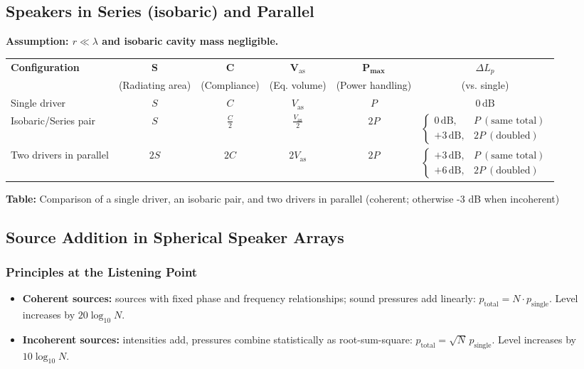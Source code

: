 \subsection{Speakers in Series (isobaric) and Parallel}
\textbf{Assumption: $r\ll\lambda$ and isobaric cavity mass negligible.}
\small
\begin{center}
\begin{tabular}{lccccc}
\toprule
\textbf{Configuration} & $\mathbf{S}$ & $\mathbf{C}$ & $\mathbf{V_{\mathrm{as}}}$ & $\mathbf{P_{\max}}$ & $\Delta L_p$ \\
 & (Radiating area) & (Compliance) & (Eq. volume) & (Power handling) & (vs. single) \\
\midrule
Single driver & 
$S$ & 
$C$ & 
$V_{\mathrm{as}}$ & 
$P$ & 
$0\,\mathrm{dB}$ \\

Isobaric/Series pair & 
$S$ & 
$\tfrac{C}{2}$ & 
$\tfrac{V_{\mathrm{as}}}{2}$ & 
$2P$ & 
$\begin{cases}
0\,\mathrm{dB}, & P\ (\text{same total})\\
+3\,\mathrm{dB}, & 2P\ (\text{doubled})
\end{cases}$ \\

Two drivers in parallel & 
$2S$ & 
$2C$ & 
$2V_{\mathrm{as}}$ & 
$2P$ & 
$\begin{cases}
+3\,\mathrm{dB}, & P\ (\text{same total})\\
+6\,\mathrm{dB}, & 2P\ (\text{doubled})
\end{cases}$\\
\bottomrule
\end{tabular}

\medskip
\textbf{Table:} Comparison of a single driver, an isobaric pair, and two drivers in parallel (coherent; otherwise -3 dB when incoherent)
\end{center}

\newpage
\subsection{Source Addition in Spherical Speaker Arrays}

\subsubsection{Principles at the Listening Point}
\begin{itemize}
  \item \textbf{Coherent sources:} sources with fixed phase and frequency relationships; sound pressures add linearly: $p_{\mathrm{total}}=N\cdot p_{\mathrm{single}}$. Level increases by $20\log_{10}N$.  
  \item \textbf{Incoherent sources:} intensities add, pressures combine statistically as root-sum-square: $p_{\mathrm{total}}=\sqrt{N}\,p_{\mathrm{single}}$. Level increases by $10\log_{10}N$.
\end{itemize}

